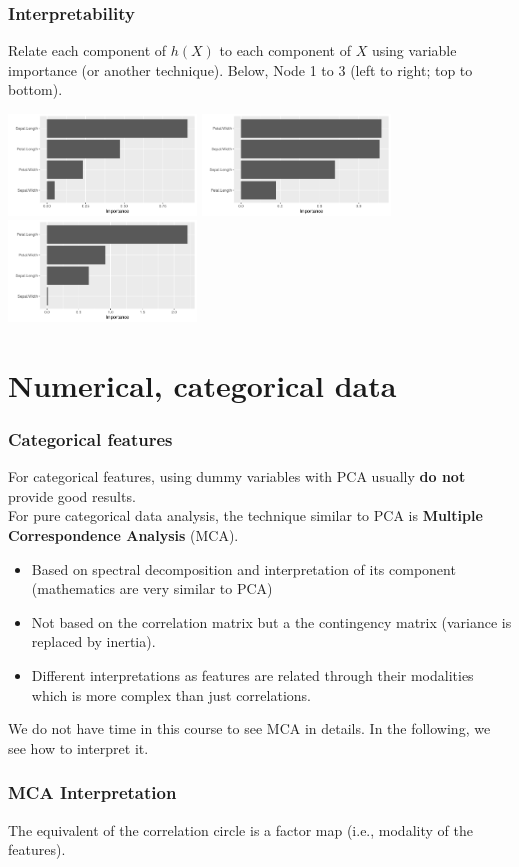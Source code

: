 \begin{frame}
\frametitle{Interpretability}
Relate each component of $h(X)$ to each component of $X$ using variable importance (or another technique). Below, Node 1 to 3 (left to right; top to bottom).
\begin{center}
\includegraphics[width=5cm]{../../Graphs/Iris_AE_VImp1.pdf}
\includegraphics[width=5cm]{../../Graphs/Iris_AE_VImp2.pdf}
\includegraphics[width=5cm]{../../Graphs/Iris_AE_VImp3.pdf}
\end{center}
\end{frame}


\section{Numerical, categorical data}
\begin{frame}
\frametitle{Categorical features}
For categorical features, using dummy variables with PCA usually {\bf do not} provide good results.\\
\vspace{0.2cm}
For pure categorical data analysis, the technique similar to PCA is {\bf Multiple Correspondence Analysis} (MCA). 
\begin{itemize}
\item Based on spectral decomposition and interpretation of its component (mathematics are very similar to PCA)
\item Not based on the correlation matrix but a the contingency matrix (variance is replaced by inertia).
\item Different interpretations as features are related through their modalities which is more complex than just correlations.
\end{itemize}
We do not have time in this course to see MCA in details. In the following, we see how to interpret it.
\end{frame}
\begin{frame}
\frametitle{MCA Interpretation}
The equivalent of the correlation circle is a factor map (i.e., modality of the features).

\end{frame}


